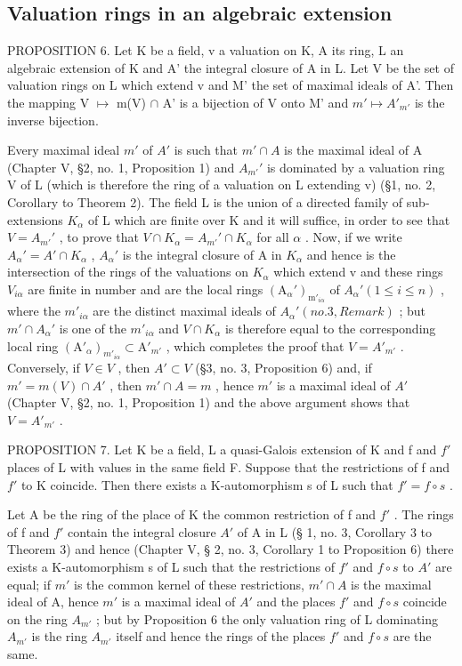 \subsection{Valuation rings in an algebraic extension}

PROPOSITION 6. Let K be a field, v a valuation on K, A its ring, L an algebraic extension of K and A' the integral closure of A in L. Let V be the set of valuation rings on L which extend v and M' the set of maximal ideals of A'. Then the mapping V \(\mapsto\) m(V) \(\cap\) A' is a bijection of V onto M' and \(m' \mapsto A'_{m'}\) is the inverse bijection.

Every maximal ideal \(m'\) of \(A'\) is such that \(m' \cap A\) is the maximal ideal of A (Chapter V, §2, no. 1, Proposition 1) and \(A_{m'}'\) is dominated by a valuation ring V of L (which is therefore the ring of a valuation on L extending v) (§1, no. 2, Corollary to Theorem 2). The field L is the union of a directed family of sub-extensions \(K_{\alpha}\) of L which are finite over K and it will suffice, in order to see that \(V = A_{m'}'\) , to prove that \(V \cap K_{\alpha} = A_{m'}' \cap K_{\alpha}\) for all \(\alpha\) . Now, if we write \(A_{\alpha}' = A' \cap K_{\alpha}\) , \(A_{\alpha}'\) is the integral closure of A in \(K_{\alpha}\) and hence is the intersection of the rings of the valuations on \(K_{\alpha}\) which extend v and these rings \(V_{i\alpha}\) are finite in number and are the local rings \((\mathrm{A}_{\alpha}')_{\mathrm{m}'_{i\alpha}}\) of \(A_{\alpha}' (1 \leqslant i \leqslant n)\) , where the \(m'_{i\alpha}\) are the distinct maximal ideals of \(A_{\alpha}' (no. 3, Remark)\) ; but \(m' \cap A_{\alpha}'\) is one of the \(m'_{i\alpha}\) and \(V \cap K_{\alpha}\) is therefore equal to the corresponding local ring \((\mathrm{A}'_{\alpha})_{m'_{i\alpha}} \subset \mathrm{A}'_{m'}\) , which completes the proof that \(V = A'_{m'}\) . Conversely, if \(V \in V\) , then \(A' \subset V\) (§3, no. 3, Proposition 6) and, if \(m' = m(V) \cap A'\) , then \(m' \cap A = m\) , hence \(m'\) is a maximal ideal of \(A'\) (Chapter V, §2, no. 1, Proposition 1) and the above argument shows that \(V = A'_{m'}\) .

PROPOSITION 7. Let K be a field, L a quasi-Galois extension of K and f and \(f'\) places of L with values in the same field F. Suppose that the restrictions of f and \(f'\) to K coincide. Then there exists a K-automorphism s of L such that \(f' = f \circ s\) .

Let A be the ring of the place of K the common restriction of f and \(f'\) . The rings of f and \(f'\) contain the integral closure \(A'\) of A in L (§ 1, no. 3, Corollary 3 to Theorem 3) and hence (Chapter V, § 2, no. 3, Corollary 1 to Proposition 6) there exists a K-automorphism s of L such that the restrictions of \(f'\) and \(f \circ s\) to \(A'\) are equal; if \(m'\) is the common kernel of these restrictions, \(m' \cap A\) is the maximal ideal of A, hence \(m'\) is a maximal ideal of \(A'\) and the places \(f'\) and \(f \circ s\) coincide on the ring \(A_{m'}\) ; but by Proposition 6 the only valuation ring of L dominating \(A_{m'}\) is the ring \(A_{m'}\) itself and hence the rings of the places \(f'\) and \(f \circ s\) are the same.

